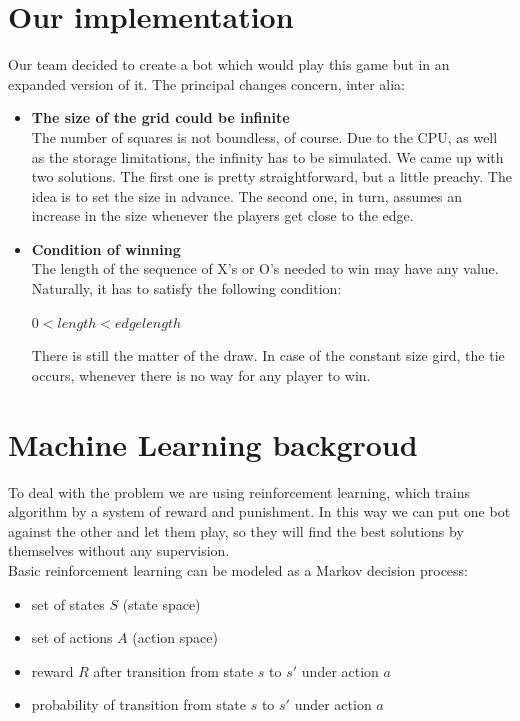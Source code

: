 \documentclass[a4paper,12pt]{book}
\begin{document}
	\section{Our implementation}
	Our team decided to create a bot which would play this game but in an expanded version of it. The principal changes concern, inter alia:\\
	\begin{itemize}
		\item \textbf{The size of the grid could be infinite}\\
		The number of squares is not boundless, of course. Due to the CPU, as well as the storage limitations, the infinity has to be simulated. We came up with two solutions. The first one is pretty straightforward, but a little preachy. The idea is to set the size in advance. The second one, in turn, assumes an increase in the size whenever the players get close to the edge.
		\item \textbf{Condition of winning}\\
		The length of the sequence of X's or O's needed to win may have any value. Naturally, it has to satisfy the following condition:
		\begin{center}
			$0 < length < edgelength$
		\end{center}
		There is still the matter of the draw. In case of the constant size gird, the tie occurs, whenever there is no way for any player to win.
	\end{itemize}
	\section{Machine Learning backgroud}
To deal with the problem we are using reinforcement learning, which trains algorithm by a system of reward and punishment. In this way we can put one bot against the other and let them play, so they will find the best solutions by themselves without any supervision. 
\\Basic reinforcement learning can be modeled as a Markov decision process:
	\begin{itemize}
		\item set of states $S$ (state space)
		\item set of actions $A$ (action space)
		\item reward $R$ after transition from state $s$ to $s'$ under action $a$
		\item probability of transition from state $s$ to $s'$ under action $a$
	\end{itemize}
\pagebreak
\end{document}
